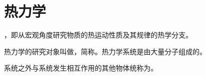 \chapter{热力学}

，即从宏观角度研究物质的热运动性质及其规律的热学分支。

热力学的研究对象叫做，简称。热力学系统是由大量分子组成的。

系统之外与系统发生相互作用的其他物体统称为。




